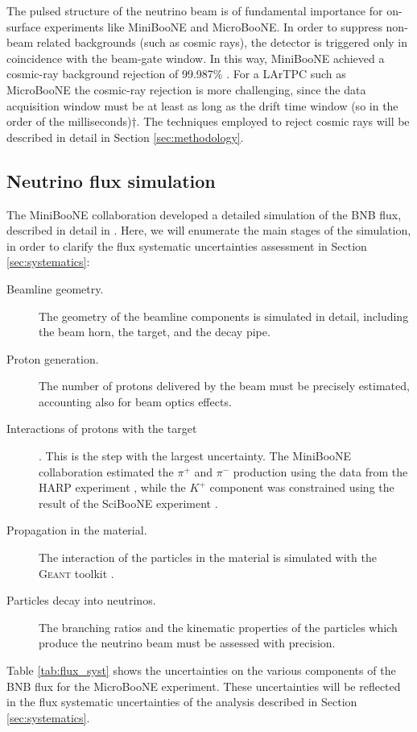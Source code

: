 The pulsed structure of the neutrino beam is of fundamental importance for on-surface experiments like MiniBooNE and MicroBooNE. In order to suppress non-beam related backgrounds (such as cosmic rays), the detector is triggered only in coincidence with the beam-gate window. In this way, MiniBooNE achieved a cosmic-ray background rejection of 99.987\% \cite{AguilarArevalo:2008qa}. For a LArTPC such as MicroBooNE the cosmic-ray rejection is more challenging, since the data acquisition window must be at least as long as the drift time window (so in the order of the milliseconds)†. The techniques employed to reject cosmic rays will be described in detail in Section \ref{sec:methodology}.
 
\subsection{Neutrino flux simulation}
The MiniBooNE collaboration developed a detailed simulation of the BNB flux, described in detail in \cite{AguilarArevalo:2008yp}. Here, we will enumerate the main stages of the simulation, in order to clarify the flux systematic uncertainties assessment in Section \ref{sec:systematics}:
\begin{description}
\item[Beamline geometry.] The geometry of the beamline components is simulated in detail, including the beam horn, the target, and the decay pipe. 
\item[Proton generation.] The number of protons delivered by the beam must be precisely estimated, accounting also for beam optics effects.
\item[Interactions of protons with the target]. This is the step with the largest uncertainty. The MiniBooNE collaboration estimated the $\pi^+$ and $\pi^-$ production using the data from the HARP experiment \cite{Catanesi:2005rc}, while the $K^+$ component was constrained using the result of the SciBooNE experiment \cite{Cheng:2011wq}. 
\item[Propagation in the material.] The interaction of the particles in the material is simulated with the \textsc{Geant} toolkit \cite{Brun:1994aa}.
\item[Particles decay into neutrinos.] The branching ratios and the kinematic properties of the particles which produce the neutrino beam must be assessed with precision.
\end{description}

Table \ref{tab:flux_syst} shows the uncertainties on the various components of the BNB flux for the MicroBooNE experiment. These uncertainties will be reflected in the flux systematic uncertainties of the analysis described in Section \ref{sec:systematics}.

